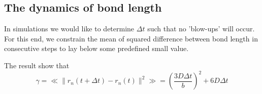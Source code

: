 \documentclass{report}
\begin{document}
\subsection{The dynamics of bond length}\label{subsection_theDynamicsOfBondLength}
In simulations we would like to determine $\Delta t$ such that no 'blow-ups' will occur. For this end, we constrain the mean of squared difference between bond length in consecutive steps to lay below some predefined small value. 

The result show that 
\begin{equation*}
\gamma=\ll\|r_n(t+\Delta t)-r_n(t) \|^2\gg = \left(\frac{3D\Delta t}{b} \right)^2+6D\Delta t
\end{equation*}


\end{document}
